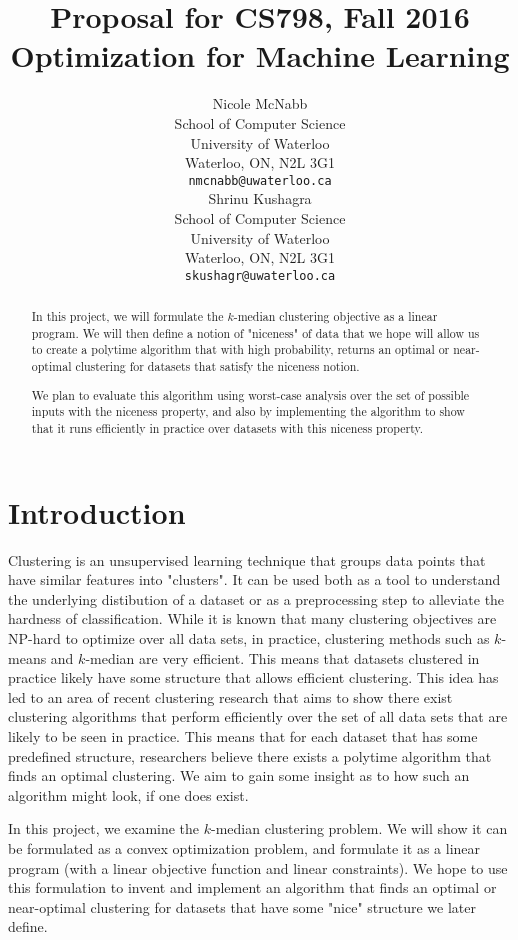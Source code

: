 \documentclass{article}
\title{Proposal for CS798, Fall 2016\\ \large Optimization for Machine Learning}
\author{
	Nicole McNabb \\
	School of Computer Science\\
	University of Waterloo\\
	Waterloo, ON, N2L 3G1 \\
	\texttt{nmcnabb@uwaterloo.ca} \\
	\And
	Shrinu Kushagra\\
	School of Computer Science\\
	University of Waterloo\\
	Waterloo, ON, N2L 3G1 \\
	\texttt{skushagr@uwaterloo.ca} \\	
}
\begin{document}
\maketitle

\begin{abstract} 
In this project, we will formulate the $k$-median clustering objective as a linear program. We will then define a notion of "niceness" of data that we hope will allow us to create a polytime algorithm that with high probability, returns an optimal or near-optimal clustering for datasets that satisfy the niceness notion.

We plan to evaluate this algorithm using worst-case analysis over the set of possible inputs with the niceness property, and also by implementing the algorithm to show that it runs efficiently in practice over datasets with this niceness property.
\end{abstract} 

\section{Introduction}
Clustering is an unsupervised learning technique that groups data points that have similar features into "clusters". It can be used both as a tool to understand the underlying distibution of a dataset or as a preprocessing step to alleviate the hardness of classification. While it is known that many clustering objectives are NP-hard to optimize over all data sets, in practice, clustering methods such as $k$-means and $k$-median are very efficient. This means that datasets clustered in practice likely have some structure that allows efficient clustering. This idea has led to an area of recent clustering research that aims to show there exist clustering algorithms that perform efficiently over the set of all data sets that are likely to be seen in practice. This means that for each dataset that has some predefined structure, researchers believe there exists a polytime algorithm that finds an optimal clustering. We aim to gain some insight as to how such an algorithm might look, if one does exist.

In this project, we examine the $k$-median clustering problem. We will show it can be formulated as a convex optimization problem, and formulate it as a linear program (with a linear objective function and linear constraints). We hope to use this formulation to invent and implement an algorithm that finds an optimal or near-optimal clustering for datasets that have some "nice" structure we later define.
\end{document}
